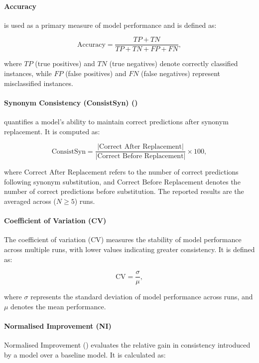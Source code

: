 \paragraph{Accuracy} is used as a primary measure of model performance and is defined as:

\begin{equation}
    \text{Accuracy} = \frac{TP + TN}{TP + TN + FP + FN},
\end{equation}

\noindent where $TP$ (true positives) and $TN$ (true negatives) denote correctly classified instances, while $FP$ (false positives) and $FN$ (false negatives) represent misclassified instances.

\paragraph{Synonym Consistency (ConsistSyn) ()} quantifies a model's ability to maintain correct predictions after synonym replacement. It is computed as:

\begin{equation}
    \text{ConsistSyn} = \frac{|\text{Correct After Replacement}|}{|\text{Correct Before Replacement}|} \times 100,
\end{equation}

\noindent where $\text{Correct After Replacement}$ refers to the number of correct predictions following synonym substitution, and $\text{Correct Before Replacement}$ denotes the number of correct predictions before substitution. The reported results are the averaged  across ($ N\geq 5$) runs. 

\paragraph{Coefficient of Variation (CV)}  
The coefficient of variation (CV) measures the stability of model performance across multiple runs, with lower values indicating greater consistency. It is defined as:

\begin{equation}
    \text{CV} = \frac{\sigma}{\mu},
\end{equation}

\noindent where $\sigma$ represents the standard deviation of model performance across runs, and $\mu$ denotes the mean performance.


\paragraph{Normalised Improvement (NI)}  
Normalised Improvement () evaluates the relative gain in consistency introduced by a model over a baseline model. It is calculated as:

